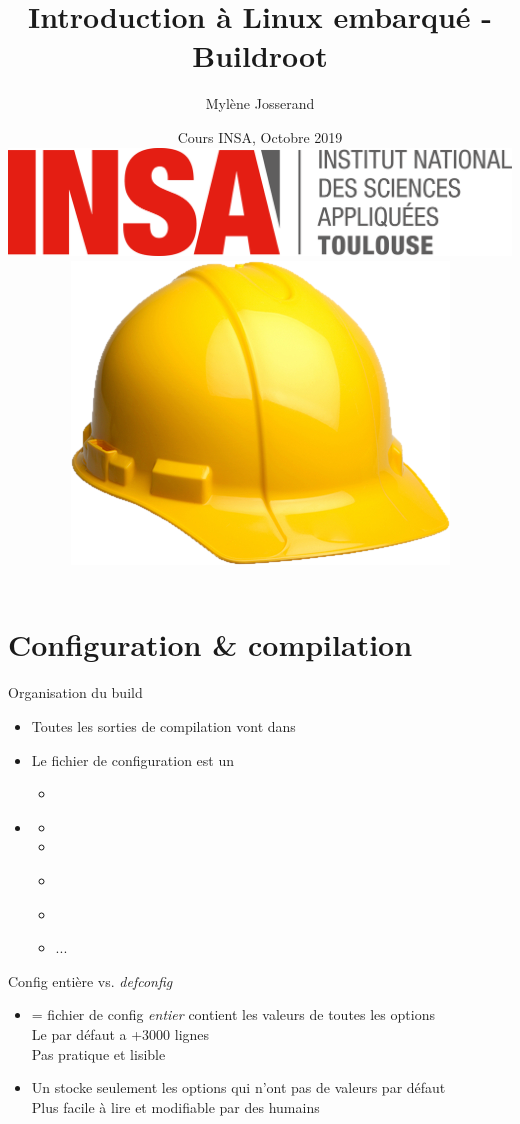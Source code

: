 \documentclass[aspectratio=169,obeyspaces,spaces,hyphens,dvipsnames]{beamer}
\title{Introduction à Linux embarqué - Buildroot}
\author[Mylène Josserand]
{Mylène Josserand}
\date[Octobre 2019]
{Cours INSA, Octobre 2019 \\
  \vspace{0.5cm}
  \includegraphics[scale=0.1]{pictures/insa-tls.png}
  \hspace{0.5cm}
  \includegraphics[scale=0.1]{pictures/br.png}
}
\institute[]
{Développeuse et formatrice Linux embarqué}
\begin{document}
\begin{frame}
  \titlepage
\end{frame}

\section{Configuration \& compilation}

\begin{frame}{Organisation du build}
  \begin{itemize}
  \item Toutes les sorties de compilation vont dans 
  \item Le fichier de configuration est un 
  \item {}
    \begin{itemize}
    \item {\bf {}}
    \item {}
    \item {}
    \item {\bf {}}
    \item {}
    \item ...
    \end{itemize}
  \end{itemize}
\end{frame}

\begin{frame}{Config entière vs. {\em defconfig}}
  \begin{itemize}
  \item {} = fichier de config {\em entier}
    \MVRightarrow contient les valeurs de toutes les options \\
    Le  par défaut a +3000 lignes \\
    \MVRightarrow Pas pratique et lisible
  \item Un  stocke seulement les options qui n'ont pas de
    valeurs par défaut \\
    \MVRightarrow Plus facile à lire et modifiable par des humains
  \end{itemize}
\end{frame}
\end{document}
